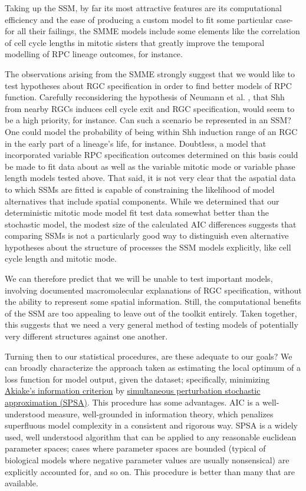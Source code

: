Taking up the SSM, by far its most attractive features are its computational efficiency and the ease of producing a custom model to fit some particular case- for all their failings, the SMME models include some elements like the correlation of cell cycle lengths in mitotic sisters that greatly improve the temporal modelling of RPC lineage outcomes, for instance.

The observations arising from the SMME strongly suggest that we would like to test hypotheses about RGC specification in order to find better models of RPC function. Carefully reconsidering the hypothesis of Neumann et al. \cite{Neumann2000}, that Shh from nearby RGCs induces cell cycle exit and RGC specification, would seem to be a high priority, for instance. Can such a scenario be represented in an SSM? One could model the probability of being within Shh induction range of an RGC in the early part of a lineage's life, for instance. Doubtless, a model that incorporated variable RPC specification outcomes determined on this basis could be made to fit data about as well as the variable mitotic mode or variable phase length models tested above. That said, it is not very clear that the aspatial data to which SSMs are fitted is capable of constraining the likelihood of model alternatives that include spatial components. While we determined that our deterministic mitotic mode model fit test data somewhat better than the stochastic model, the modest size of the calculated AIC differences suggests that comparing SSMs is not a particularly good way to distinguish even alternative hypotheses about the structure of processes the SSM models explicitly, like cell cycle length and mitotic mode. 

We can therefore predict that we will be unable to test important models, involving documented macromolecular explanations of RGC specification, without the ability to represent some spatial information. Still, the computational benefits of the SSM are too appealing to leave out of the toolkit entirely. Taken together, this suggests that we need a very general method of testing models of potentially very different structures against one another.

Turning then to our statistical procedures, are these adequate to our goals? We can broadly characterize the approach taken as estimating the local optimum of a loss function for model output, given the dataset; specifically, minimizing \hyperref[AIC]{Akiake's information criterion} by \hyperref[SPSA]{simultaneous perturbation stochastic approximation (SPSA)}. This procedure has some advantages. AIC is a well-understood measure, well-grounded in information theory, which penalizes superfluous model complexity in a consistent and rigorous way. SPSA is a widely used, well understood algorithm that can be applied to any reasonable euclidean parameter spaces; cases where parameter spaces are bounded (typical of biological models where negative parameter values are usually nonsensical) are explicitly accounted for, and so on. This procedure is better than many that are available.

